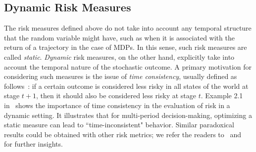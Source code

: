 \documentclass{article} %
\newcommand{\citet}{\cite}
\begin{document}

\subsection{Dynamic Risk Measures}

The risk measures defined above do not take into account any temporal structure that the random variable might have, such as when it is associated with the return of a trajectory in the case of MDPs. In this sense, such risk measures are called \emph{static}. {\em Dynamic} risk measures, on the other hand, explicitly take into account the temporal nature of the stochastic outcome. A primary motivation for considering such measures is the issue of \emph{time consistency}, usually defined as follows~\cite{ruszczynski2010risk}: if a certain outcome is considered less risky in all states of the world at stage $t+1$, then it should also be considered less risky at stage $t$.
Example 2.1 in~\citet{iancu2011tight} shows the importance of time consistency in the evaluation of risk in a dynamic setting. It illustrates that for multi-period decision-making, optimizing a static measure can lead to ``time-inconsistent" behavior. Similar paradoxical results could be obtained with other risk metrics; we refer the readers to~\citet{ruszczynski2010risk} and~\citet{iancu2011tight} for further insights.



\end{document}
